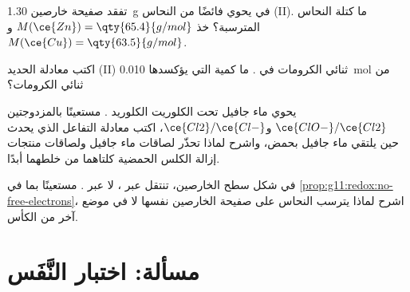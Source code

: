 \begin{exercise}[$\star\star\star$]\label{exo:g11:redox:12}
تفقد صفيحة خارصين \qty{1.30}{g} في  يحوي فائضًا من
 النحاس (II). ما كتلة النحاس المترسبة؟ خذ
$M(\ce{Zn}) = \qty{65.4}{g/mol}$ و$M(\ce{Cu}) = \qty{63.5}{g/mol}$.
\end{exercise}

\begin{exercise}[$\star\star\star$]\label{exo:g11:redox:13}
اكتب معادلة   الحديد (II)  ثنائي الكرومات
في . ما كمية  التي يؤكسدها
\qty{0.010}{mol} من  ثنائي الكرومات؟
\end{exercise}

\begin{exercise}[$\star\star\star$]\label{exo:g11:redox:14}
يحوي ماء جافيل  تحت الكلوريت   الكلوريد
. مستعينًا بالمزدوجتين $\ce{ClO-}/\ce{Cl2}$ و$\ce{Cl2}/\ce{Cl-}$،
اكتب معادلة التفاعل الذي يحدث حين يلتقي ماء جافيل
بحمض، واشرح لماذا تحذّر لصاقات ماء جافيل ولصاقات منتجات إزالة الكلس
الحمضية كلتاهما من خلطهما أبدًا.
\end{exercise}

\begin{exercise}[$\star\star\star$]\label{exo:g11:redox:15}
في شكل سطح الخارصين، تنتقل  عبر
، لا عبر . مستعينًا بما في \cref{prop:g11:redox:no-free-electrons}،
اشرح لماذا يترسب النحاس على صفيحة الخارصين نفسها لا
في موضع آخر من الكأس.
\end{exercise}

\section{مسألة: اختبار النَّفَس}

